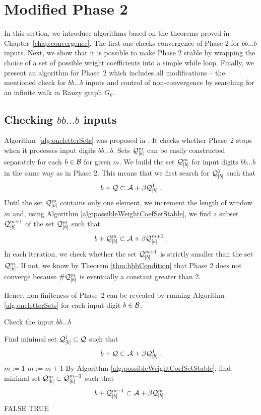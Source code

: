 \section{Modified Phase 2}
\label{sec:modifiedPhase2}

In this section, we introduce algorithms based on the theorems proved in Chapter~\ref{chap:convergence}. The first one checks convergence of Phase 2 for $bb\dots b$ inputs. Next, we show that it is possible to make Phase 2 stable by wrapping the choice of a set of possible weight coefficients into a simple while loop. Finally, we present an algorithm for Phase~2 which includes all modifications -- the mentioned check for $bb\dots b$ inputs and control of non-convergence by searching for an infinite walk in Rauzy graph $G_k$.

\subsection*{Checking $bb\dots b$ inputs}

Algorithm~\ref{alg:oneletterSets} was proposed in \cite{vu}. It checks whether Phase~2 stops when it processes input digits $bb\dots b$.
Sets $\mathcal{Q}_{[\scriptstyle b]}^{\scriptstyle m}$  can be easily constructed separately for each $b\in\mathcal{B}$ for given $m$. We build the set $\mathcal{Q}_{[\scriptstyle b]}^{\scriptstyle m}$ for input digits $bb\dots b$ in the same way as in Phase 2. This means that we first search for $\mathcal{Q}_{[\scriptstyle b]}^{\scriptstyle 1}$ such that 
$$
b + \mathcal{Q} \subset \mathcal{A} + \beta \mathcal{Q}_{[\scriptstyle b]}^{\scriptstyle 1}\,.
$$
Until the set $\mathcal{Q}_{[\scriptstyle b]}^{\scriptstyle m}$ contains only one element, we increment the length of  window $m$ and, using Algorithm \ref{alg:possibleWeightCoefSetStable}, we find a subset $\mathcal{Q}_{[\scriptstyle b]}^{\scriptstyle m+1}$ of the set $\mathcal{Q}_{[\scriptstyle b]}^{\scriptstyle m}$ such that
$$
b + \mathcal{Q}_{[\scriptstyle b]}^{\scriptstyle m} \subset \mathcal{A} + \beta \mathcal{Q}_{[\scriptstyle b]}^{\scriptstyle m+1}\,.
$$
In each iteration, we check whether the set $\mathcal{Q}_{[\scriptstyle b]}^{\scriptstyle m+1}$ is strictly smaller than the set $\mathcal{Q}_{[\scriptstyle b]}^{\scriptstyle m}$. If not, we know by Theorem \ref{thm:bbbCondition} that Phase 2 does not converge because $\#\mathcal{Q}_{[\scriptstyle b]}^{\scriptstyle m}$ is eventually a constant greater than 2.

Hence, non-finiteness of Phase~2 can be revealed by running Algorithm \ref{alg:oneletterSets} for each input digit $b\in\mathcal{B}$.
\begin{algorithm}
  \caption{Check the input $bb\dots b$}
    \label{alg:oneletterSets}
  \begin{algorithmic}[1]
    \STATE Find minimal set $\mathcal{Q}_{[\scriptstyle b]}^{\scriptstyle 1} \subset \mathcal{Q}$ such that
      $$
      b + \mathcal{Q} \subset \mathcal{A} + \beta \mathcal{Q}_{[\scriptstyle b]}^{\scriptstyle 1}\,.
      $$
      \vspace{-20pt}
    \STATE $m:=1$
        \STATE $m:= m +1$
        \STATE By Algorithm \ref{alg:possibleWeightCoefSetStable}, find minimal set $\mathcal{Q}_{[\scriptstyle b]}^{\scriptstyle m} \subset \mathcal{Q}_{[\scriptstyle b]}^{\scriptstyle m-1}$ such that
          $$
          b + \mathcal{Q}_{[\scriptstyle b]}^{\scriptstyle m-1} \subset \mathcal{A} + \beta \mathcal{Q}_{[\scriptstyle b]}^{\scriptstyle m}\,.
          $$  
          \vspace{-20pt}
            \RETURN FALSE
        \ENDIF
    \ENDWHILE  
    \RETURN TRUE
  \end{algorithmic}
\end{algorithm}


